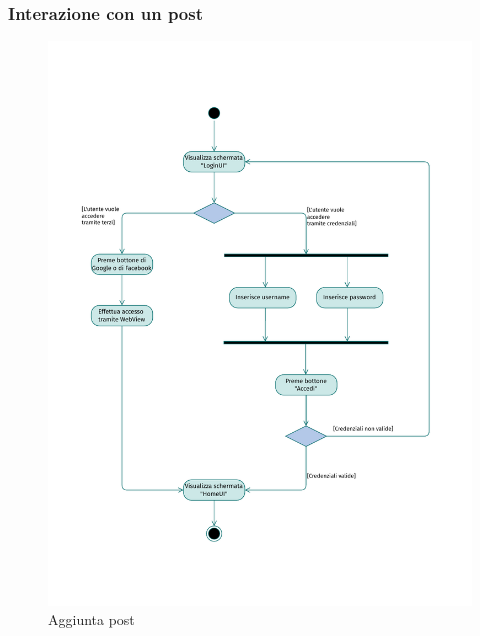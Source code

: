 \documentclass{natourDoc}
\begin{document}
\subsubsection{Interazione con un post}
\begin{figure}[!htbp]
	\centering
	\includegraphics[width=\textwidth, page=3]{./diagrams/activity.pdf}
	\caption{Aggiunta post}
\end{figure}
\FloatBarrier
\end{document}
